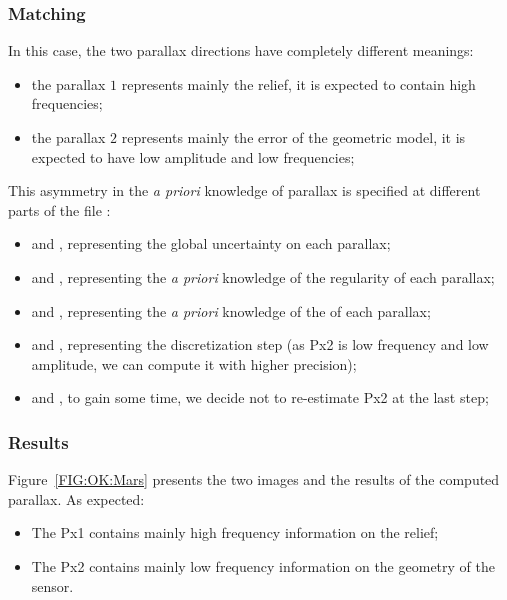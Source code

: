\subsubsection{Matching}

In this case, the two parallax directions have completely different meanings:

\begin{itemize}
   \item the parallax $1$ represents mainly the relief, it is expected to contain high frequencies;
   \item the parallax $2$ represents mainly the error of the geometric model, it is expected to have
         low amplitude and low frequencies;
\end{itemize}

This asymmetry in the \emph{a priori} knowledge of parallax is specified at different parts of the file :

\begin{itemize}
   \item {\tt <Px1IncCalc>}   and {\tt <Px2IncCalc>},  representing the global uncertainty on each parallax;
   \item {\tt <Px1Regul>}   and {\tt <Px2Regul>},  representing the \emph{a priori} knowledge of the regularity of each
         parallax;
   \item {\tt <Px1PenteMax>}   and {\tt <Px2PenteMax>},  representing the \emph{a priori} knowledge of the
          of each parallax;
   \item {\tt <Px1Pas>}   and {\tt <Px2Pas>},  representing the discretization step (as Px2 is low frequency and
         low amplitude, we can compute it with higher precision);
   \item {\tt <Px1DilatAlti>}   and {\tt <Px2DilatAlti>}, to gain some time, we decide not to re-estimate Px2 at the last step;
\end{itemize}

\subsubsection{Results}

Figure~\ref{FIG:OK:Mars} presents the two images and the results of the computed parallax.
As expected:

\begin{itemize}
   \item The Px1 contains mainly high frequency information on the relief;
   \item The Px2 contains mainly low frequency information on  the geometry of the sensor.
\end{itemize}


